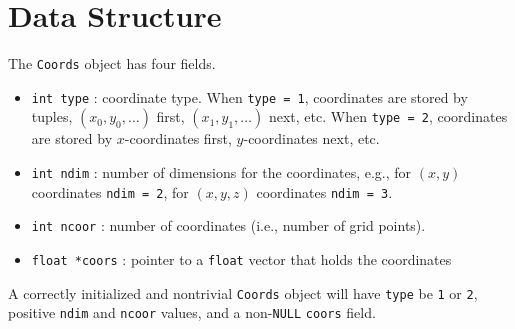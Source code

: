 \par
\section{Data Structure}
\par
The {\tt Coords} object has four fields.
\begin{itemize}
\item {\tt int type} : coordinate type.
When {\tt type = 1}, coordinates are stored by tuples,
$(x_0,y_0,\ldots)$ first,
$(x_1,y_1,\ldots)$ next, etc.
When {\tt type = 2}, coordinates are stored by $x$-coordinates
first, $y$-coordinates next, etc.
\item {\tt int ndim} : 
number of dimensions for the coordinates, 
e.g., for $(x,y)$ coordinates {\tt ndim = 2},
for $(x,y,z)$ coordinates {\tt ndim = 3}.
\item {\tt int ncoor} : 
number of coordinates (i.e., number of grid points).
\item {\tt float *coors} : 
pointer to a {\tt float} vector that holds the coordinates
\end{itemize}
A correctly initialized and nontrivial {\tt Coords} object 
will have {\tt type} be {\tt 1} or {\tt 2},
positive {\tt ndim} and {\tt ncoor} values,
and a non-{\tt NULL} {\tt coors} field.

